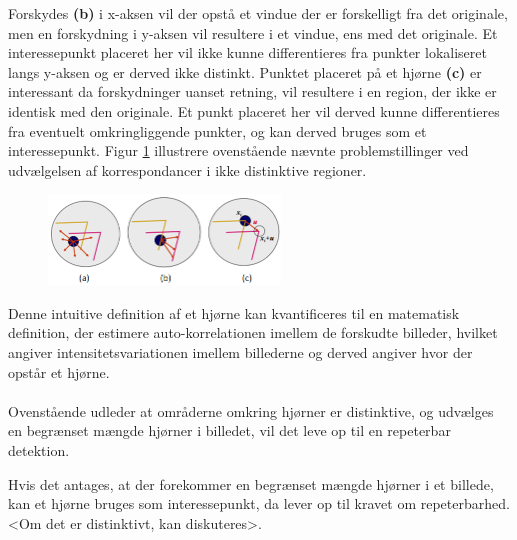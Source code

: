 Forskydes \textbf{(b)} i x-aksen vil der opstå et vindue der er forskelligt fra det originale, men en forskydning i y-aksen vil resultere i et vindue, ens med det originale. Et interessepunkt placeret her vil ikke kunne differentieres fra punkter lokaliseret langs y-aksen og er derved ikke distinkt. Punktet placeret på et hjørne \textbf{(c)} er interessant da forskydninger uanset retning, vil resultere i en region, der ikke er identisk med den originale. Et punkt placeret her vil derved kunne differentieres fra eventuelt omkringliggende punkter, og kan derved bruges som et interessepunkt. Figur \ref{app} illustrere ovenstående nævnte problemstillinger ved udvælgelsen af korrespondancer i ikke distinktive regioner.
\begin{figure}[H]
    \centering
    \includegraphics[width=0.55\textwidth]{fig/37.png}
    \vspace{-1em}   
    \begin{center}    
    \caption{\textcolor{gray}{\footnotesize \textit{
 }}}
    \label{app}
     \end{center}
    \vspace{-2.7em}  
  \end{figure}  
\noindent
Denne intuitive definition af et hjørne kan kvantificeres til en matematisk definition, der estimere auto-korrelationen imellem de forskudte billeder, hvilket angiver intensitetsvariationen imellem billederne og derved angiver hvor der opstår et hjørne.
\\ \\
Ovenstående udleder at områderne omkring hjørner er distinktive, og udvælges en begrænset mængde hjørner i billedet, vil det leve op til en repeterbar detektion.

Hvis det antages, at der forekommer en begrænset mængde hjørner i et billede, kan et hjørne bruges som interessepunkt, da lever op til kravet om repeterbarhed. <Om det er distinktivt, kan diskuteres>.